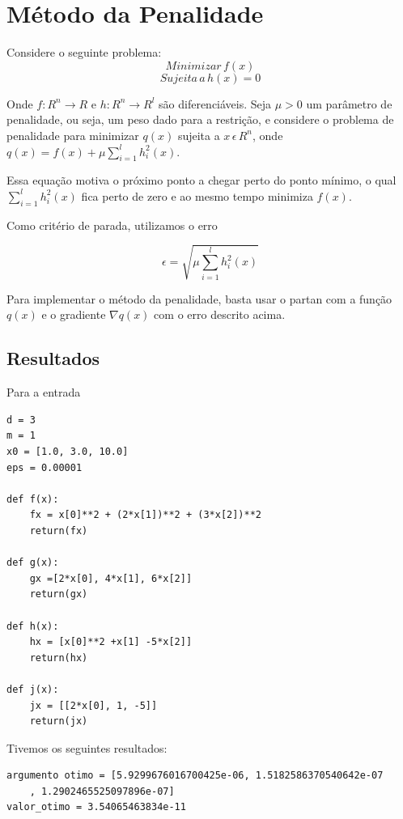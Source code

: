 \documentclass[12pt]{article}
\begin{document}
\section{Método da Penalidade}
\mbox{}

Considere o seguinte problema:
$$Minimizar \, f(x)$$
$$Sujeita \, a\, h(x) = 0$$

Onde $f:R^{n} \rightarrow R$ e $h:R^{n} \rightarrow R^{l}$ são diferenciáveis.
Seja $\mu > 0$ um parâmetro de penalidade, ou seja, um peso dado para a restrição, e considere o problema de penalidade para minimizar $q(x)$ sujeita a $x\, \epsilon \, R^{n}$, onde $q(x) = f(x) + \mu \sum^{l}_{i=1} h^{2}_{i}(x)$. 

Essa equação motiva o próximo ponto a chegar perto do ponto mínimo, o qual $\sum^{l}_{i=1} h^{2}_{i}(x)$ fica perto de zero e ao mesmo tempo minimiza $f(x)$.

Como critério de parada, utilizamos o erro

\begin{equation}
	\epsilon = \sqrt{\mu \sum^{l}_{i=1} h^{2}_{i}(x)}
\end{equation}

Para implementar o método da penalidade, basta usar o partan com a função $q(x)$ e o gradiente $\nabla q(x)$ com o erro descrito acima.

\subsection{Resultados}
\mbox{}

Para a entrada

\begin{verbatim}
d = 3
m = 1
x0 = [1.0, 3.0, 10.0]
eps = 0.00001

def f(x):
    fx = x[0]**2 + (2*x[1])**2 + (3*x[2])**2
    return(fx)

def g(x):
    gx =[2*x[0], 4*x[1], 6*x[2]]
    return(gx)

def h(x):
    hx = [x[0]**2 +x[1] -5*x[2]]
    return(hx)

def j(x):
    jx = [[2*x[0], 1, -5]]
    return(jx)
\end{verbatim}

Tivemos os seguintes resultados:

\begin{verbatim}
argumento otimo = [5.9299676016700425e-06, 1.5182586370540642e-07
    , 1.2902465525097896e-07]
valor_otimo = 3.54065463834e-11
\end{verbatim}
\end{document}
